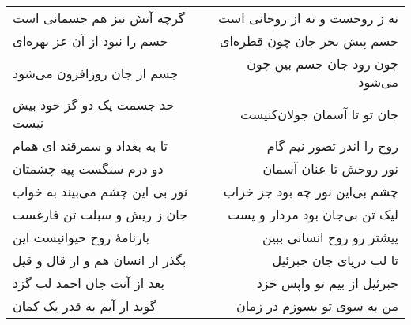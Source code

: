 \begin{center}
\begin{longtable}{l p{0.5cm} r}
\\
گرچه آتش نیز هم جسمانی است
&&
نه ز روحست و نه از روحانی است
\\
جسم را نبود از آن عز بهره‌ای
&&
جسم پیش بحر جان چون قطره‌ای
\\
جسم از جان روزافزون می‌شود
&&
چون رود جان جسم بین چون می‌شود
\\
حد جسمت یک دو گز خود بیش نیست
&&
جان تو تا آسمان جولان‌کنیست
\\
تا به بغداد و سمرقند ای همام
&&
روح را اندر تصور نیم گام
\\
دو درم سنگست پیه چشمتان
&&
نور روحش تا عنان آسمان
\\
نور بی این چشم می‌بیند به خواب
&&
چشم بی‌این نور چه بود جز خراب
\\
جان ز ریش و سبلت تن فارغست
&&
لیک تن بی‌جان بود مردار و پست
\\
بارنامهٔ روح حیوانیست این
&&
پیشتر رو روح انسانی ببین
\\
بگذر از انسان هم و از قال و قیل
&&
تا لب دریای جان جبرئیل
\\
بعد از آنت جان احمد لب گزد
&&
جبرئیل از بیم تو واپس خزد
\\
گوید ار آیم به قدر یک کمان
&&
من به سوی تو بسوزم در زمان
\\
\end{longtable}
\end{center}
